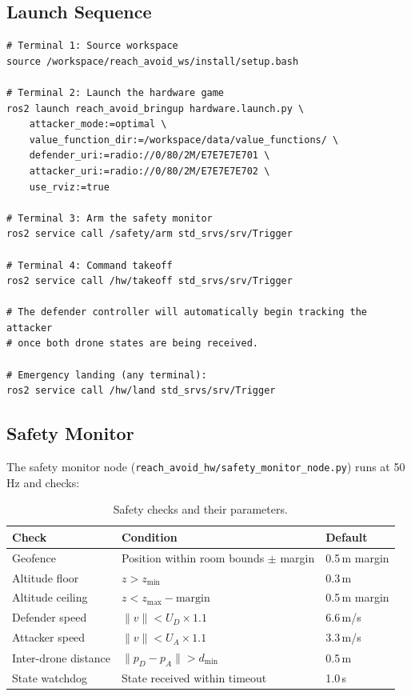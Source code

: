 \documentclass[11pt,a4paper]{article}
\begin{document}
\subsection{Launch Sequence}

\begin{lstlisting}[style=bashstyle]
# Terminal 1: Source workspace
source /workspace/reach_avoid_ws/install/setup.bash

# Terminal 2: Launch the hardware game
ros2 launch reach_avoid_bringup hardware.launch.py \
    attacker_mode:=optimal \
    value_function_dir:=/workspace/data/value_functions/ \
    defender_uri:=radio://0/80/2M/E7E7E7E701 \
    attacker_uri:=radio://0/80/2M/E7E7E7E702 \
    use_rviz:=true

# Terminal 3: Arm the safety monitor
ros2 service call /safety/arm std_srvs/srv/Trigger

# Terminal 4: Command takeoff
ros2 service call /hw/takeoff std_srvs/srv/Trigger

# The defender controller will automatically begin tracking the attacker
# once both drone states are being received.

# Emergency landing (any terminal):
ros2 service call /hw/land std_srvs/srv/Trigger
\end{lstlisting}

\subsection{Safety Monitor}

The safety monitor node (\texttt{reach\_avoid\_hw/safety\_monitor\_node.py}) runs at 50\,Hz and checks:

\begin{table}[h]
\centering
\caption{Safety checks and their parameters.}
\begin{tabular}{lll}
\toprule
\textbf{Check} & \textbf{Condition} & \textbf{Default} \\
\midrule
Geofence & Position within room bounds $\pm$ margin & 0.5\,m margin \\
Altitude floor & $z > z_\text{min}$ & 0.3\,m \\
Altitude ceiling & $z < z_\text{max} - \text{margin}$ & 0.5\,m margin \\
Defender speed & $\|v\| < U_D \times 1.1$ & 6.6\,m/s \\
Attacker speed & $\|v\| < U_A \times 1.1$ & 3.3\,m/s \\
Inter-drone distance & $\|p_D - p_A\| > d_\text{min}$ & 0.5\,m \\
State watchdog & State received within timeout & 1.0\,s \\
\bottomrule
\end{tabular}
\end{table}
\end{document}
